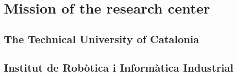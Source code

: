 
\chapter{Mission of the research center}
\label{context}

\section{The Technical University of Catalonia}

\section{Institut de Robòtica i Informàtica Industrial}
